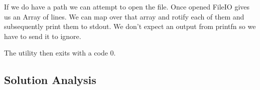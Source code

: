 If we do have a path we can attempt to open the file. Once opened FileIO gives us an
Array of lines. We can map over that array and rotify each of them and subsequently print them to stdout.
We don't expect an output from printfn so we have to send it to ignore.

The utility then exits with a code 0.

\subsection{Solution Analysis}
